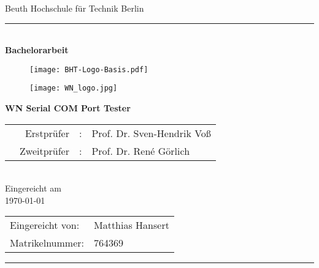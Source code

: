 

\begin{titlepage}
	\begin{center}
		\Large
		Beuth Hochschule für Technik Berlin
		\textcolor{darkBHT}{\rule{\textwidth}{0.2cm}} \\
		\vspace{2 cm}
		\Huge
		\textbf{Bachelorarbeit}
		\vspace{2 cm}
		
		\begin{figure}[htbp]
			\centering 
			\texttt{[image: BHT-Logo-Basis.pdf]} 
		\end{figure}
		
		\begin{figure}[htbp]
			\centering 
			\texttt{[image: WN\_logo.jpg]} 
		\end{figure}		
		
		\Large
		\textbf{WN Serial COM Port Tester}\\
		\vspace{2cm}
		\begin{tabular}{rrll}
			&Erstprüfer&: &Prof. Dr. Sven-Hendrik Voß\\
			&Zweitprüfer&: &Prof. Dr. René Görlich\\
		\end{tabular} 
		\\
		\vspace{0.8cm}
		Eingereicht am \\
		\today %
		\vspace{0.8cm}
		
		
		\begin{tabular}{ll}
		Eingereicht von: &Matthias Hansert\\
		Matrikelnummer:  &764369\\
		\end{tabular}

	\end{center}
	\vfill
	\textcolor{darkBHT}{\rule{\textwidth}{0.2cm}}
	\vspace{1 cm}
	\normalsize
	
\end{titlepage}

\newpage
\thispagestyle{empty}
\mbox{}
